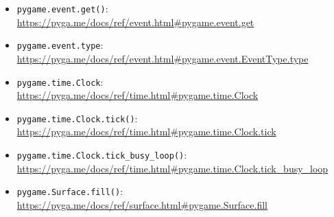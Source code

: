 \begin{itemize}
	\item \texttt{pygame.event.get()}:
	\\
	\url{https://pyga.me/docs/ref/event.html#pygame.event.get}
	
	\item \texttt{pygame.event.type}:
	\\
	\url{https://pyga.me/docs/ref/event.html#pygame.event.EventType.type}
	
	\item \texttt{pygame.time.Clock}:
	\\
	\url{https://pyga.me/docs/ref/time.html#pygame.time.Clock}

	\item \texttt{pygame.time.Clock.tick()}:
	\\
	\url{https://pyga.me/docs/ref/time.html#pygame.time.Clock.tick}
	
	\item \texttt{pygame.time.Clock.tick\_busy\_loop()}:
	\\
	\url{https://pyga.me/docs/ref/time.html#pygame.time.Clock.tick_busy_loop}
	
	\item \texttt{pygame.Surface.fill()}:
	\\
	\url{https://pyga.me/docs/ref/surface.html#pygame.Surface.fill}
\end{itemize}

